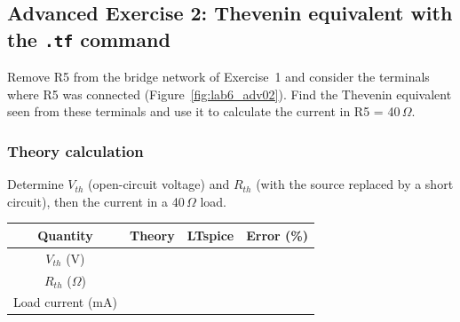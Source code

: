 \subsection{Advanced Exercise 2: Thevenin equivalent with the \texttt{.tf} command}
Remove R5 from the bridge network of Exercise~1 and consider the terminals where R5 was connected (Figure~\ref{fig:lab6_adv02}). Find the Thevenin equivalent seen from these terminals and use it to calculate the current in R5 = 40\,$\Omega$.


\subsubsection{Theory calculation}\vspace{-3pt}\notesblock Determine $V_{th}$ (open-circuit voltage) and $R_{th}$ (with the source replaced by a short circuit), then the current in a 40\,$\Omega$ load.

\begin{center}\renewcommand{\arraystretch}{1.8}\begin{tabular}{|c|c|c|c|}\hline \textbf{Quantity} & \textbf{Theory} & \textbf{LTspice} & \textbf{Error (\%)}\\ \hline $V_{th}$ (V) & & & \\ \hline $R_{th}$ ($\Omega$) & & & \\ \hline Load current (mA) & & & \\ \hline \end{tabular}\end{center}
\newpage
